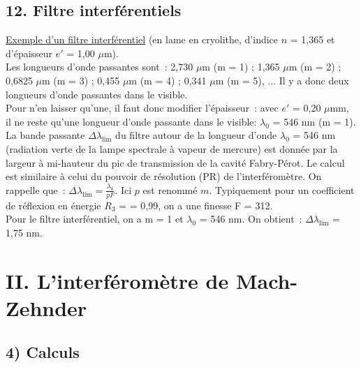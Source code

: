 \documentclass{article}
\begin{document}
\subsection*{12.  Filtre interférentiels}
\underline{Exemple d'un filtre interférentiel} (en lame en
cryolithe, d'indice $n$ = 1,365 et d'épaisseur $e'$ = 1,00 $\mu$m). \\
Les longueurs d'onde passantes sont : 2,730 $\mu$m (m = 1) ; 1,365
$\mu$m (m = 2) ; 0,6825 $\mu$m (m = 3) ; 0,455 $\mu$m (m = 4) ;
0,341 $\mu$m (m = 5), ... Il y a donc deux longueurs d'onde
passantes dans le
visible. \\
Pour n'en laisser qu'une, il faut donc modifier l'épaisseur : avec
$e'$ = 0,20 $\mu$mm, il ne reste qu'une longueur d'onde passante
dans le visible: $\lambda_{0}$ = 546 nm (m = 1). La bande passante
$\Delta \lambda_{\mathrm{lim}}$ du filtre autour de la longueur d'onde
$\lambda_{0}$ = 546 nm (radiation verte de la lampe spectrale à
vapeur de mercure) est donnée par la largeur à mi-hauteur du pic de
transmission de la cavité Fabry-Pérot. Le calcul est similaire à
celui du pouvoir de résolution (PR) de l'interféromètre. On rappelle
que : $\Delta \lambda_{\mathrm{lim}} = \frac{\lambda_{0}}{pF}$. Ici $p$ est
renommé $m$. Typiquement pour un coefficient de réflexion en énergie
$R_{3}$
= = 0,99, on a une finesse F = 312. \\
Pour le filtre interférentiel, on a m = 1 et $\lambda_{0}$ = 546 nm.
On obtient : $\Delta \lambda_{\mathrm{lim}}$ = 1,75 nm.

\section*{II. L'interféromètre de Mach-Zehnder}
\subsection*{4) Calculs}
\end{document}
